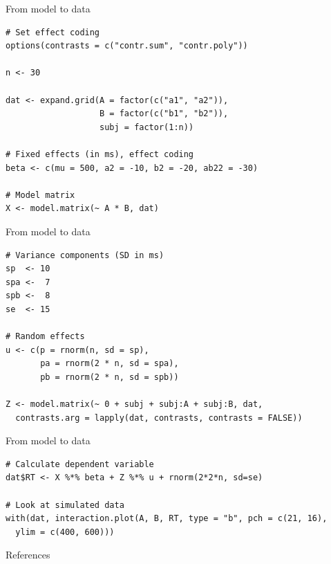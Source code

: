 \documentclass[aspectratio=169]{beamer}
\begin{document}
{

\begin{frame}[fragile]{From model to data}
  \begin{lstlisting}
# Set effect coding 
options(contrasts = c("contr.sum", "contr.poly"))

n <- 30

dat <- expand.grid(A = factor(c("a1", "a2")), 
                   B = factor(c("b1", "b2")),
                   subj = factor(1:n))

# Fixed effects (in ms), effect coding
beta <- c(mu = 500, a2 = -10, b2 = -20, ab22 = -30)

# Model matrix 
X <- model.matrix(~ A * B, dat)
  \end{lstlisting}
\end{frame}

\begin{frame}[fragile]{From model to data}
  \begin{lstlisting}
# Variance components (SD in ms)
sp  <- 10
spa <-  7
spb <-  8
se  <- 15

# Random effects
u <- c(p = rnorm(n, sd = sp), 
       pa = rnorm(2 * n, sd = spa), 
       pb = rnorm(2 * n, sd = spb))

Z <- model.matrix(~ 0 + subj + subj:A + subj:B, dat, 
  contrasts.arg = lapply(dat, contrasts, contrasts = FALSE))
  \end{lstlisting}
\end{frame}


\begin{frame}[fragile]{From model to data}
\begin{lstlisting}
# Calculate dependent variable
dat$RT <- X %*% beta + Z %*% u + rnorm(2*2*n, sd=se)

# Look at simulated data
with(dat, interaction.plot(A, B, RT, type = "b", pch = c(21, 16),
  ylim = c(400, 600)))
\end{lstlisting}
  \nocite{Wickelmaier2022}
\end{frame}

}

% 
% 
% 

\appendix

\begin{frame}{References}
  \printbibliography
  \vfill
\end{frame}
\end{document}
